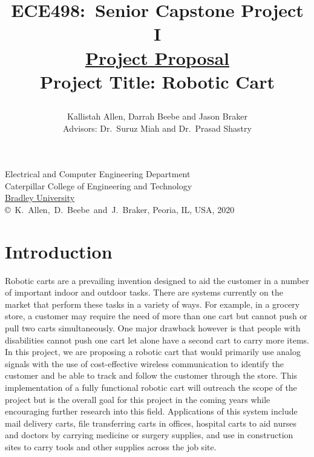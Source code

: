 \documentclass[letterpaper,12pt]{article}   %
\title{ECE498:~Senior Capstone Project I\\\textbf{\underline{Project Proposal}}\\
\vspace{0.5in}
Project Title: Robotic Cart
\vspace{1.0in}
\author{Kallistah Allen, Darrah Beebe and Jason Braker\\ Advisors: Dr.~Suruz Miah and Dr.~Prasad Shastry}
}
\date{}  %
\begin{document}
\begin{titlepage}
 \maketitle

\vspace*{4.0cm}
\begin{center}
\normalsize
Electrical and Computer Engineering Department\\
Caterpillar College of Engineering and Technology\\
\href{http://www.bradley.edu/}{Bradley University}\\

\vspace*{6.0cm}
\copyright~K.~Allen,~D.~Beebe~and~J.~Braker, Peoria, IL, USA, 2020\\

\end{center}
\thispagestyle{empty}

\end{titlepage} 
\newpage
\renewcommand{\contentsname}{Table of Contents}
\tableofcontents
\newpage

\section{Introduction} %


Robotic carts are a prevailing invention designed to aid the customer in a number of important indoor and outdoor tasks. There are systems currently on the market that perform these tasks in a variety of ways. For example, in a grocery store, a customer may require the need of more than one cart but cannot push or pull two carts simultaneously. One major drawback however is that people with disabilities cannot push one cart let alone have a second cart to carry more items. In this project, we are proposing a robotic cart that would primarily use analog signals with the use of cost-effective wireless communication to identify the customer and be able to track and follow the customer through the store. This implementation of a fully functional robotic cart will outreach the scope of the project but is the overall goal for this project in the coming years while encouraging further research into this field. Applications of this system include mail delivery carts, file transferring carts in offices, hospital carts to aid nurses and doctors by carrying medicine or surgery supplies, and use in construction sites to carry tools and other supplies across the job site.
\end{document}
